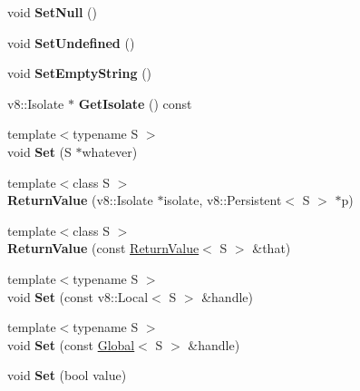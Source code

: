 \begin{DoxyCompactItemize}
void {\bfseries Set\+Null} ()
\item 
\mbox{\label{class_return_value_a39857f0a5e06b05a7d9dc92db992826e}} 
void {\bfseries Set\+Undefined} ()
\item 
\mbox{\label{class_return_value_a0b226fddc9e78d3df5e9e1e1eb8fa4bc}} 
void {\bfseries Set\+Empty\+String} ()
\item 
\mbox{\label{class_return_value_a8400056fd48b2093f44a8856001c7733}} 
v8\+::\+Isolate $\ast$ {\bfseries Get\+Isolate} () const
\item 
\mbox{\label{class_return_value_a20d0ac2c7b9c4b78a5aa008a05f86cdd}} 
{\footnotesize template$<$typename S $>$ }\\void {\bfseries Set} (S $\ast$whatever)
\item 
\mbox{\label{class_return_value_a3cd024e26d6de25c4dec778a548bb8d1}} 
{\footnotesize template$<$class S $>$ }\\{\bfseries Return\+Value} (v8\+::\+Isolate $\ast$isolate, v8\+::\+Persistent$<$ S $>$ $\ast$p)
\item 
\mbox{\label{class_return_value_a5d8901ddad32bc895f1cadbe6bae43c8}} 
{\footnotesize template$<$class S $>$ }\\{\bfseries Return\+Value} (const \hyperlink{class_return_value}{Return\+Value}$<$ S $>$ \&that)
\item 
\mbox{\label{class_return_value_a52598063029ad6ee4c8fde58a59b4e0a}} 
{\footnotesize template$<$typename S $>$ }\\void {\bfseries Set} (const v8\+::\+Local$<$ S $>$ \&handle)
\item 
\mbox{\label{class_return_value_a20898a6aa3a7b0827909318becec4029}} 
{\footnotesize template$<$typename S $>$ }\\void {\bfseries Set} (const \hyperlink{class_global}{Global}$<$ S $>$ \&handle)
\item 
\mbox{\label{class_return_value_a9b042e86dc824f42ed8fd3125af38f2d}} 
void {\bfseries Set} (bool value)

\end{DoxyCompactItemize}
